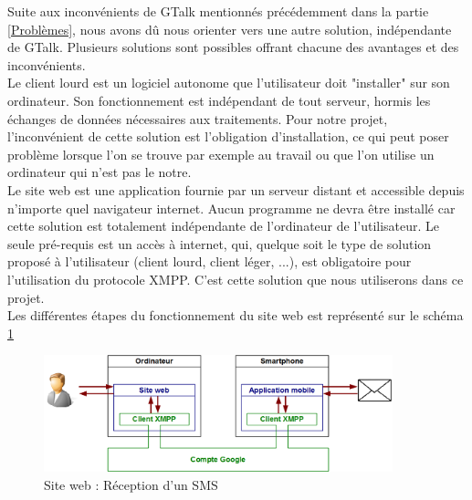 Suite aux inconvénients de GTalk mentionnés précédemment dans la partie \ref{Problèmes}, nous avons dû nous orienter vers une autre solution, indépendante de GTalk.
Plusieurs solutions sont possibles offrant chacune des avantages et des inconvénients.
\\


Le client lourd est un logiciel autonome que l'utilisateur doit "installer" sur son ordinateur.
Son fonctionnement est indépendant de tout serveur, hormis les échanges de données nécessaires aux traitements.
Pour notre projet, l'inconvénient de cette solution est l'obligation d'installation, ce qui peut poser problème lorsque l'on se trouve par exemple au travail ou que l'on utilise un ordinateur qui n'est pas le notre.
\\


Le site web est une application fournie par un serveur distant et accessible depuis n'importe quel navigateur internet.
Aucun programme ne devra être installé car cette solution est totalement indépendante de l'ordinateur de l'utilisateur.
Le seule pré-requis est un accès à internet, qui, quelque soit le type de solution proposé à l'utilisateur (client lourd, client léger, ...), est obligatoire pour l'utilisation du protocole XMPP.
C'est cette solution que nous utiliserons dans ce projet.
\\


Les différentes étapes du fonctionnement du site web est représenté sur le schéma \ref{schemaFonctionnement_siteWeb}
\begin{figure}[!h]
	\center
	\includegraphics[width=0.9\textwidth]{img/schemaFonctionnement_siteWeb.png}
	\caption{Site web : Réception d'un SMS}
	\label{schemaFonctionnement_siteWeb}
\end{figure}
